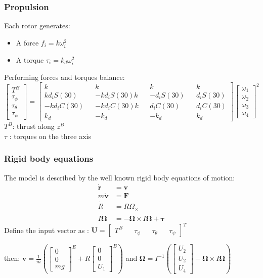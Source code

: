 \documentclass[xcolor=dvipsnames]{beamer}
\begin{document}
\begin{frame}
\frametitle{Propulsion}
Each rotor generates:\begin{itemize}
\item A force $f_i = k \omega_i ^ 2$
\item A torque $\tau_i = k_d \omega_i ^ 2$
\end{itemize} 
Performing forces and torques balance:
\begin{equation*}
\begin{bmatrix}
T^B\\\tau_\phi\\\tau_\theta\\\tau_\psi
\end{bmatrix} = \begin{bmatrix}
k&&k&&k&&k\\
k d_i S(30)&&-k d_i S(30)k&& -d_i S(30)&&d_i S(30)\\
-k d_i C(30)&&-k d_i C(30)k&& d_i C(30)&&d_i C(30)\\
k_d&&-k_d&&-k_d&&k_d
\end{bmatrix} \begin{bmatrix}
\omega_1\\\omega_2\\\omega_3\\\omega_4
\end{bmatrix}^2
\end{equation*}
$T^B$: thrust along $z^B$ \\ $\tau$ : torques on the three axis
\end{frame}

\begin{frame}[t]
\frametitle{Rigid body equations}
The model is described by the well known rigid body equations of motion:
\begin{align*}
\boldsymbol{\dot{r}}& = \boldsymbol{v}\\ 
m\boldsymbol{\dot{v}}& = \boldsymbol{F}\\ 
\dot{R}& = R\Omega_\times\\ 
I\boldsymbol{\dot{\Omega}}& = -\boldsymbol{\Omega} \times I\boldsymbol{\Omega} + \boldsymbol{\tau}
\end{align*}
Define the input vector as : $\textbf{U} = \begin{bmatrix}
T^B&&\tau_\phi && \tau_\theta && \tau_\psi
\end{bmatrix}^T$
\vspace{2em}

then: $\boldsymbol{\dot{v}} = \frac{1}{m}\left(\begin{bmatrix}0\\0\\mg\end{bmatrix}^E + R\begin{bmatrix}0\\0\\U_1\end{bmatrix}^B\right)$  and $\boldsymbol{\dot{\Omega}} =I^{-1}\left(\begin{bmatrix}
U_2\\U_2\\U_4
\end{bmatrix} -\boldsymbol{\Omega} \times I\boldsymbol{\Omega}\right)$
\end{frame}
\end{document}
